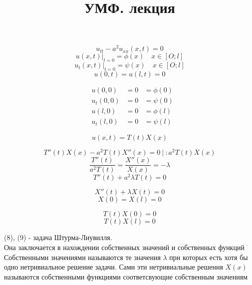 \documentclass[a4paper]{article}
\begin{document}
\title{УМФ. лекция}
\maketitle

\begin{equation}
    u_{t t} - a^2u_{xx}(x,t) = 0
\end{equation}
\begin{equation}
    u(x,t) |_{t=0} =\phi(x) \quad x \in [O; l]
\end{equation}
\begin{equation}
    u_t(x,t) |_{t=0} = \psi(x) \quad x \in [O; l]
\end{equation}
\begin{equation}
    u(0,t) = u(l,t)=0
\end{equation}

\begin{equation}
    \begin{aligned}
        & u(0,0) &= 0 &= \phi(0)\\
        & u_t(0,0) &= 0 &= \psi(0) \\
        & u(l,0) &= 0 &= \phi(l) \\
        & u_t(l,0) &= 0 &= \psi(l) 
    \end{aligned}
\end{equation}

\begin{equation}
    u(x,t) = T(t)X(x)
\end{equation}

\[
    T''(t)X(x) - a^2 T(t) X''(x) = 0 \ | \ : a^2 T(t) X(x)
\]
\[
    \frac{T''(t)}{a^2T(t)} = \frac{X''(x)}{X(x)}  = - \lambda
\]
\begin{equation}
    T''(t) + a^2 \lambda T(t) = 0
\end{equation}

\begin{equation}
    X''(t) + \lambda X(t) = 0
\end{equation}
\begin{equation}
    X(0) = X(l) = 0
\end{equation}

\[
    T(t) X(0) = 0
\]
\[
    T(t) X(l) = 0
\]

(8), (9) - задача Штурма-Лиувилля.\\
Она заключается в нахождении собственных значений и собственных функций\\
Собственными значениями называются те значения $ \lambda $ при которых есть хотя
бы одно нетривиальное решение задачи. Сами эти нетривиальные решения $ X(x) $ 
называются собственными функциями соответсвующие собственным значениям
\end{document}
